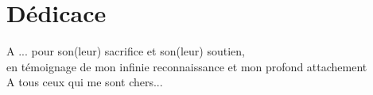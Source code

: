 \documentclass[a4paper, oneside, 12pt, final]{extreport}
\newcommand{\reportAuthor} {%
  Olfa \textsc{CHAOUECH}%
}
\begin{document}
\chapter*{D\'edicace}
\thispagestyle{empty}
%

\begin{center}
{\it 
	
A ... pour son(leur) sacrifice et son(leur) soutien, \\
en témoignage de mon infinie reconnaissance et mon profond attachement \\
\vspace{1cm}
A tous ceux qui me sont chers...

}
\end{center}
%
%

\end{document}
